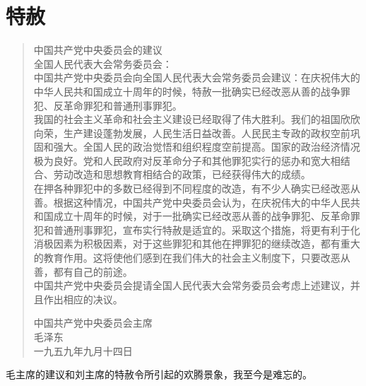 \fancyhead[RO]{} %
\fancyhead[LE]{} %
\chapter*{特赦}
\thispagestyle{empty}
\begin{quote}
	中国共产党中央委员会的建议\\

全国人民代表大会常务委员会：\\

中国共产党中央委员会向全国人民代表大会常务委员会建议：在庆祝伟大的中华人民共和国成立十周年的时候，特赦一批确实已经改恶从善的战争罪犯、反革命罪犯和普通刑事罪犯。\\

我国的社会主义革命和社会主义建设已经取得了伟大胜利。我们的祖国欣欣向荣，生产建设蓬勃发展，人民生活日益改善。人民民主专政的政权空前巩固和强大。全国人民的政治觉悟和组织程度空前提高。国家的政治经济情况极为良好。党和人民政府对反革命分子和其他罪犯实行的惩办和宽大相结合、劳动改造和思想教育相结合的政策，已经获得伟大的成绩。\\

在押各种罪犯中的多数已经得到不同程度的改造，有不少人确实已经改恶从善。根据这种情况，中国共产党中央委员会认为，在庆祝伟大的中华人民共和国成立十周年的时候，对于一批确实已经改恶从善的战争罪犯、反革命罪犯和普通刑事罪犯，宣布实行特赦是适宜的。采取这个措施，将更有利于化消极因素为积极因素，对于这些罪犯和其他在押罪犯的继续改造，都有重大的教育作用。这将使他们感到在我们伟大的社会主义制度下，只要改恶从善，都有自己的前途。\\

中国共产党中央委员会提请全国人民代表大会常务委员会考虑上述建议，并且作出相应的决议。\\

\begin{flushright}
	中国共产党中央委员会主席\\

毛泽东\\

一九五九年九月十四日\\
\end{flushright}
\end{quote}

毛主席的建议和刘主席的特赦令所引起的欢腾景象，我至今是难忘的。\\

